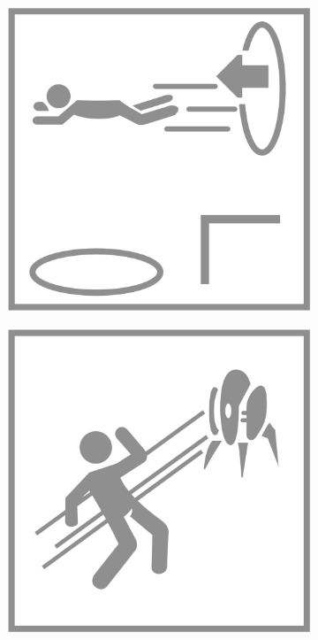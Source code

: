 \begin{figure}[H]
  \begin{subfigure}[l]{0.195\linewidth}
    \includegraphics[width=\textwidth]{Sources/PortalIcons/d6.jpg}
  \end{subfigure}
  \begin{subfigure}[l]{0.195\linewidth}
    \includegraphics[width=\textwidth]{Sources/PortalIcons/d7.jpg}

\end{subfigure}
\end{figure}
